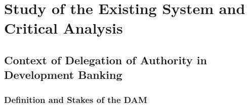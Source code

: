 \section{Study of the Existing System and Critical Analysis}


\subsection{Context of Delegation of Authority in Development Banking}


\subsubsection{Definition and Stakes of the DAM}


